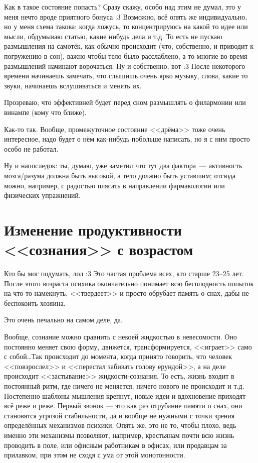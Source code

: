 \documentclass[a4paper,14pt,oneside]{memoir}
\begin{document}
Как в такое состояние попасть? Сразу скажу, особо над этим не думал, это у меня нечто вроде приятного бонуса :3 Возможно, всё опять же индивидуально, но у меня схема такова: когда ложусь, то концентрируюсь на какой то идее или мысли, обдумываю статью, какие нибудь дела и т.д. То есть не пускаю размышления на самотёк, как обычно происходит (что, собственно, и приводит к погружению в сон), важно чтобы тело было расслаблено, а то многие во время размышлений начинают ворочаться. Ну и собственно, вот :3 После некоторого времени начинаешь замечать, что слышишь очень ярко музыку, слова, какие то звуки, начинаешь вслушиваться и менять их.
 
Прозреваю, что эффективней будет перед сном размышлять о филармонии или винампе (кому что ближе).
 
Как-то так. Вообще, промежуточное состояние <<дрёма>> тоже очень интересное, надо будет о нём как-нибудь побольше написать, но я с ним просто особо не работал.
 
Ну и напоследок: ты, думаю, уже заметил что тут два фактора~--- активность мозга/разума должна быть высокой, а тело должно быть уставшим; отсюда можно, например, с радостью плясать в направлении фармакологии или физических упражнений. 




\section{Изменение продуктивности <<сознания>> с возрастом}


\medskip
Кто бы мог подумать, лол :3 Это частая проблема всех, кто старше 23--25 лет. После этого возраста психика окончательно понимает всю бесплодность попыток на что-то намекнуть, <<твердеет>> и просто обрубает память о снах, дабы не беспокоить хозяина.
 
Это очень печально на самом деле, да. 

Вообще, сознание можно сравнить с некоей жидкостью в невесомости. Оно постоянно меняет свою форму, движется, трансформируется, <<играет>> само с собой\ldots Так происходит до момента, когда принято говорить, что человек <<повзрослел>> и <<перестал забивать голову ерундой>>, а на деле происходит <<застывание>> жидкости-сознания. То есть, жизнь входит в постоянный ритм, где ничего не меняется, ничего нового не происходит и т.д. Постепенно шаблоны мышления крепнут, новые идеи и вдохновение приходят всё реже и реже. 
Первый звонок — это как раз отрубание памяти о снах, они становятся угрозой стабильности, да и вообще не нужными с точки зрения определённых механизмов психики. Опять же, это не то, чтобы плохо, ведь именно эти механизмы позволяют, например, крестьянам почти всю жизнь проводить в поле, или офисным работникам в офисах, или продавцам за прилавком, при этом не сходя с ума от этой монотонности. 
\end{document}
